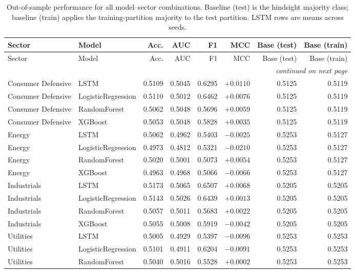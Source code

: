 \begin{longtable}{llrrrrrr}
\caption{Out-of-sample performance for all model--sector combinations. Baseline (test) is the hindsight majority class; baseline (train) applies the training-partition majority to the test partition. LSTM rows are means across seeds.}\label{tab:full}\\
\toprule
Sector & Model & Acc. & AUC & F1 & MCC & Base (test) & Base (train) \\
\midrule
\endfirsthead
\toprule
Sector & Model & Acc. & AUC & F1 & MCC & Base (test) & Base (train) \\
\midrule
\endhead
\midrule \multicolumn{8}{r}{\emph{continued on next page}}\\
\endfoot
\bottomrule
\endlastfoot
Consumer Defensive & LSTM & 0.5109 & 0.5045 & 0.6295 & $+0.0110$ & 0.5125 & 0.5119 \\
Consumer Defensive & LogisticRegression & 0.5110 & 0.5012 & 0.6462 & $+0.0076$ & 0.5125 & 0.5119 \\
Consumer Defensive & RandomForest & 0.5062 & 0.5048 & 0.5696 & $+0.0059$ & 0.5125 & 0.5119 \\
Consumer Defensive & XGBoost & 0.5053 & 0.5048 & 0.5828 & $+0.0035$ & 0.5125 & 0.5119 \\
Energy & LSTM & 0.5062 & 0.4962 & 0.5403 & $-0.0025$ & 0.5253 & 0.5127 \\
Energy & LogisticRegression & 0.4973 & 0.4812 & 0.5321 & $-0.0210$ & 0.5253 & 0.5127 \\
Energy & RandomForest & 0.5020 & 0.5001 & 0.5073 & $+0.0054$ & 0.5253 & 0.5127 \\
Energy & XGBoost & 0.4963 & 0.4968 & 0.5066 & $-0.0066$ & 0.5253 & 0.5127 \\
Industrials & LSTM & 0.5173 & 0.5065 & 0.6507 & $+0.0068$ & 0.5205 & 0.5205 \\
Industrials & LogisticRegression & 0.5143 & 0.5026 & 0.6439 & $+0.0013$ & 0.5205 & 0.5205 \\
Industrials & RandomForest & 0.5057 & 0.5011 & 0.5683 & $+0.0022$ & 0.5205 & 0.5205 \\
Industrials & XGBoost & 0.5055 & 0.5008 & 0.5919 & $-0.0042$ & 0.5205 & 0.5205 \\
Utilities & LSTM & 0.5005 & 0.4929 & 0.5397 & $-0.0096$ & 0.5253 & 0.5253 \\
Utilities & LogisticRegression & 0.5101 & 0.4911 & 0.6204 & $-0.0091$ & 0.5253 & 0.5253 \\
Utilities & RandomForest & 0.5040 & 0.5016 & 0.5528 & $+0.0002$ & 0.5253 & 0.5253 \\

\end{longtable}
